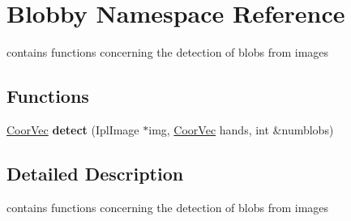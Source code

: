 \hypertarget{namespaceBlobby}{
\section{Blobby Namespace Reference}
\label{namespaceBlobby}
}


contains functions concerning the detection of blobs from images  


\subsection*{Functions}
\begin{DoxyCompactItemize}
\item 
\hypertarget{namespaceBlobby_a6b0a3fc6359a4eab65507fad4011d0bd}{
\hyperlink{blobby_8h_a7017012a1393f7249d0e03d6ac9f1c7b}{CoorVec} {\bfseries detect} (IplImage $\ast$img, \hyperlink{blobby_8h_a7017012a1393f7249d0e03d6ac9f1c7b}{CoorVec} hands, int \&numblobs)}
\label{namespaceBlobby_a6b0a3fc6359a4eab65507fad4011d0bd}

\end{DoxyCompactItemize}


\subsection{Detailed Description}
contains functions concerning the detection of blobs from images 